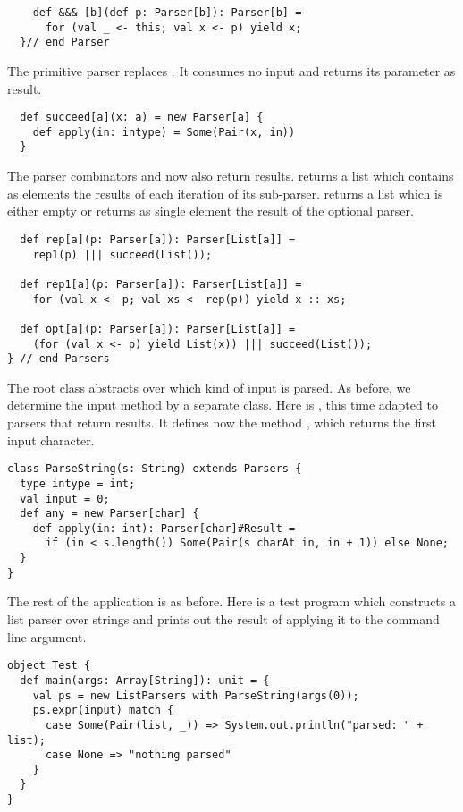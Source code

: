 {\begin{lstlisting}
    def &&& [b](def p: Parser[b]): Parser[b] = 
      for (val _ <- this; val x <- p) yield x;
  }// end Parser
\end{lstlisting}

The primitive parser  replaces . It consumes
no input and returns its parameter as result.
\begin{lstlisting}
  def succeed[a](x: a) = new Parser[a] {
    def apply(in: intype) = Some(Pair(x, in))
  }
\end{lstlisting}

The parser combinators  and  now also return
results.  returns a list which contains as elements the
results of each iteration of its sub-parser.  returns a list
which is either empty or returns as single element the result of the
optional parser.
\begin{lstlisting}
  def rep[a](p: Parser[a]): Parser[List[a]] =
    rep1(p) ||| succeed(List());

  def rep1[a](p: Parser[a]): Parser[List[a]] =
    for (val x <- p; val xs <- rep(p)) yield x :: xs;

  def opt[a](p: Parser[a]): Parser[List[a]] =
    (for (val x <- p) yield List(x)) ||| succeed(List());
} // end Parsers
\end{lstlisting}
The root class  abstracts over which kind of
input is parsed.  As before, we determine the input method by a separate class.
Here is , this time adapted to parsers that return results.
It defines now the method , which returns the first input character.
\begin{lstlisting}
class ParseString(s: String) extends Parsers {
  type intype = int;
  val input = 0;
  def any = new Parser[char] {
    def apply(in: int): Parser[char]#Result =
      if (in < s.length()) Some(Pair(s charAt in, in + 1)) else None;
  }
}
\end{lstlisting}
The rest of the application is as before. Here is a test program which
constructs a list parser over strings and prints out the result of
applying it to the command line argument.
\begin{lstlisting}
object Test {
  def main(args: Array[String]): unit = {
    val ps = new ListParsers with ParseString(args(0));
    ps.expr(input) match {
      case Some(Pair(list, _)) => System.out.println("parsed: " + list);
      case None => "nothing parsed"
    }
  }
}
\end{lstlisting}

}
